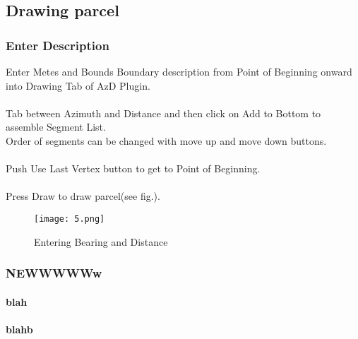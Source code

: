 \documentclass{report}
\begin{document}
\subsection{Drawing parcel}
\subsubsection{Enter Description} 
\large Enter Metes and Bounds Boundary description from Point of Beginning onward into Drawing Tab of AzD Plugin.\\\\Tab between Azimuth and Distance and then click on Add to Bottom to assemble Segment List.\\\small Order of segments can be changed with move up and move down buttons.\\\\Push Use Last Vertex button to get to Point of Beginning.\\\\Press Draw to draw parcel(see fig.).

\begin{figure}[H]
\begin{center}
	\texttt{[image: 5.png]} 
	\end{center}
	\caption{Entering Bearing and Distance}
\end{figure}

\pagebreak

\subsubsection{NEWWWWWw}
\paragraph{blah}
\paragraph{blahb}

\end{document}
